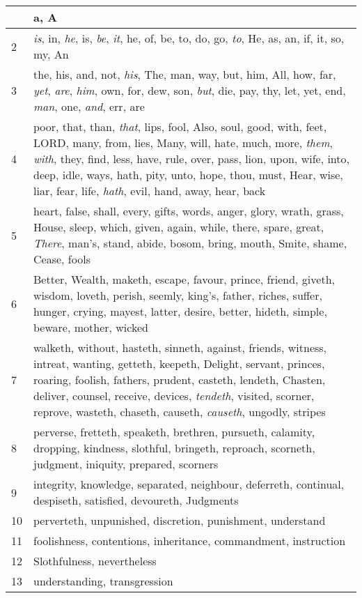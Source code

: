 \begin{center}
\begin{longtable}{l|p{3.75in}}
\hline \hline 
\endlastfoot 
1 & a, A\\ \hline 
2 & \emph{is}, in, \emph{he}, is, \emph{be}, \emph{it}, he, of, be, to, do, go, \emph{to}, He, as, an, if, it, so, my, An\\ \hline 
3 & the, his, and, not, \emph{his}, The, man, way, but, him, All, how, far, \emph{yet}, \emph{are}, \emph{him}, own, for, dew, son, \emph{but}, die, pay, thy, let, yet, end, \emph{man}, one, \emph{and}, err, are\\ \hline 
4 & poor, that, than, \emph{that}, lips, fool, Also, soul, good, with, feet, LORD, many, from, lies, Many, will, hate, much, more, \emph{them}, \emph{with}, they, find, less, have, rule, over, pass, lion, upon, wife, into, deep, idle, ways, hath, pity, unto, hope, thou, must, Hear, wise, liar, fear, life, \emph{hath}, evil, hand, away, hear, back\\ \hline 
5 & heart, false, shall, every, gifts, words, anger, glory, wrath, grass, House, sleep, which, given, again, while, there, spare, great, \emph{There}, man's, stand, abide, bosom, bring, mouth, Smite, shame, Cease, fools\\ \hline 
6 & Better, Wealth, maketh, escape, favour, prince, friend, giveth, wisdom, loveth, perish, seemly, king's, father, riches, suffer, hunger, crying, mayest, latter, desire, better, hideth, simple, beware, mother, wicked\\ \hline 
7 & walketh, without, hasteth, sinneth, against, friends, witness, intreat, wanting, getteth, keepeth, Delight, servant, princes, roaring, foolish, fathers, prudent, casteth, lendeth, Chasten, deliver, counsel, receive, devices, \emph{tendeth}, visited, scorner, reprove, wasteth, chaseth, causeth, \emph{causeth}, ungodly, stripes\\ \hline 
8 & perverse, fretteth, speaketh, brethren, pursueth, calamity, dropping, kindness, slothful, bringeth, reproach, scorneth, judgment, iniquity, prepared, scorners\\ \hline 
9 & integrity, knowledge, separated, neighbour, deferreth, continual, despiseth, satisfied, devoureth, Judgments\\ \hline 
10 & perverteth, unpunished, discretion, punishment, understand\\ \hline 
11 & foolishness, contentions, inheritance, commandment, instruction\\ \hline 
12 & Slothfulness, nevertheless\\ \hline 
13 & understanding, transgression\\ \hline 
\end{longtable} 
\end{center} 




 
